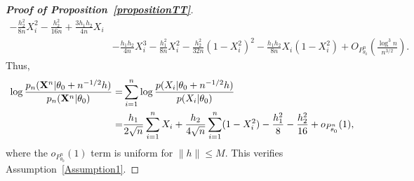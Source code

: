 \documentclass[11pt]{article}
\theoremstyle{plain}
\theoremstyle{definition}
\theoremstyle{remark}
\begin{document}
\begin{appendices}
\begin{proof}[\textbf{Proof of Proposition~\ref{propositionTT}}]
\begin{equation*}
\begin{split}
    -\frac{h_2^2}{8n}X_i^2
-\frac{h_2^2}{16n}
+\frac{3 h_1 h_2}{4 n}  X_i
\\
     &-\frac{h_1 h_2}{4 n}X_i^3
     -\frac{h_1^2}{8n}X_i^2
     -\frac{h_2^2}{32n}(1-X_i^2)^2
     -\frac{h_1 h_2}{8n}X_i(1-X_i^2)
     +O_{P^n_{\theta_0}}\left(\frac{\log^3 n}{n^{3/2}}\right).
    \end{split}
\end{equation*}
Thus,
\begin{equation*}
    \begin{split}
        \log 
        \frac{p_n(\mathbf{X}^{n}|\theta_0+n^{-1/2}h)}{p_n(\mathbf{X}^{n}|\theta_0)}=&
        \sum_{i=1}^n\log \frac{p(X_i|\theta_0+n^{-1/2}h)}{p(X_i|\theta_0)}
    \\
    =&
    \frac{h_1}{2\sqrt{n}} \sum_{i=1}^n X_i
+
\frac{h_2}{4\sqrt{n}} \sum_{i=1}^n (1-X_i^2)
     -\frac{h_1^2}{8}
     -\frac{h_2^2}{16}
     +o_{P^n_{\theta_0}}(1),
    \end{split}
\end{equation*}
where the $o_{P^n_{\theta_0}}(1)$ term is uniform for $\|h\|\leq M$.
This verifies Assumption~\ref{Assumption1}.


\end{proof}
\end{appendices}
\end{document}
